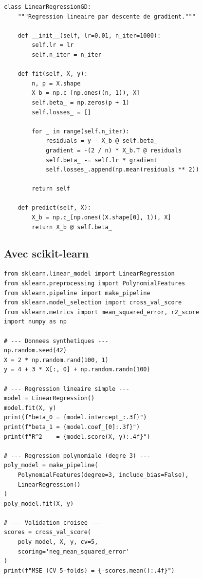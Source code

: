 \begin{codeblock}[title=\textbf{Descente de gradient pour la r\'egression lin\'eaire}]
\begin{verbatim}
class LinearRegressionGD:
    """Regression lineaire par descente de gradient."""

    def __init__(self, lr=0.01, n_iter=1000):
        self.lr = lr
        self.n_iter = n_iter

    def fit(self, X, y):
        n, p = X.shape
        X_b = np.c_[np.ones((n, 1)), X]
        self.beta_ = np.zeros(p + 1)
        self.losses_ = []

        for _ in range(self.n_iter):
            residuals = y - X_b @ self.beta_
            gradient = -(2 / n) * X_b.T @ residuals
            self.beta_ -= self.lr * gradient
            self.losses_.append(np.mean(residuals ** 2))

        return self

    def predict(self, X):
        X_b = np.c_[np.ones((X.shape[0], 1)), X]
        return X_b @ self.beta_
\end{verbatim}
\end{codeblock}

\subsection{Avec scikit-learn}

\begin{codeblock}[title=\textbf{R\'egression lin\'eaire et polynomiale avec scikit-learn}]
\begin{verbatim}
from sklearn.linear_model import LinearRegression
from sklearn.preprocessing import PolynomialFeatures
from sklearn.pipeline import make_pipeline
from sklearn.model_selection import cross_val_score
from sklearn.metrics import mean_squared_error, r2_score
import numpy as np

# --- Donnees synthetiques ---
np.random.seed(42)
X = 2 * np.random.rand(100, 1)
y = 4 + 3 * X[:, 0] + np.random.randn(100)

# --- Regression lineaire simple ---
model = LinearRegression()
model.fit(X, y)
print(f"beta_0 = {model.intercept_:.3f}")
print(f"beta_1 = {model.coef_[0]:.3f}")
print(f"R^2    = {model.score(X, y):.4f}")

# --- Regression polynomiale (degre 3) ---
poly_model = make_pipeline(
    PolynomialFeatures(degree=3, include_bias=False),
    LinearRegression()
)
poly_model.fit(X, y)

# --- Validation croisee ---
scores = cross_val_score(
    poly_model, X, y, cv=5,
    scoring='neg_mean_squared_error'
)
print(f"MSE (CV 5-folds) = {-scores.mean():.4f}")
\end{verbatim}
\end{codeblock}

